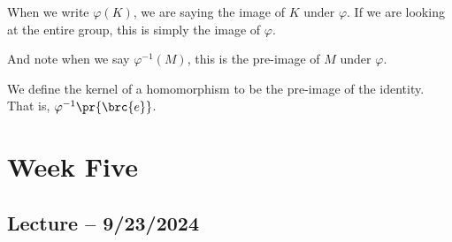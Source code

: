 \documentclass[openany]{book}
\begin{document}
\begin{rmk}
	When we write $\varphi(K)$, we are saying the image of $K$ under $\varphi$. If we are looking at the entire group, this is simply the image of $\varphi$.
	
	And note when we say $\varphi^{-1}(M)$, this is the pre-image of $M$ under $\varphi$.
\end{rmk}

\begin{defn}[Kernel]
	We define the kernel of a homomorphism to be the pre-image of the identity. That is, $\varphi^{-1}\pr{ \brc{e}}$.
\end{defn}

\chapter{Week Five}
\section{Lecture -- 9/23/2024}
\end{document}
